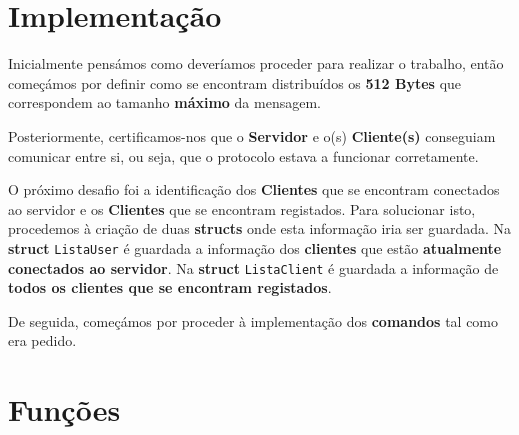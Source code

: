 \documentclass[11pt]{article}   %
\begin{document}
\section{Implementação}

\hspace{0,5cm}Inicialmente pensámos como deveríamos proceder para realizar o trabalho, então 
começámos por definir como se encontram distribuídos os \textbf{512 Bytes} que correspondem ao
tamanho \textbf{máximo} da mensagem.

Posteriormente, certificamos-nos que o \textbf{Servidor} e o(s) \textbf{Cliente(s)} conseguiam
comunicar entre si, ou seja, que o protocolo estava a funcionar corretamente.

O próximo desafio foi a identificação dos \textbf{Clientes} que se encontram conectados ao servidor
e os \textbf{Clientes} que se encontram registados. Para solucionar isto, procedemos à criação de duas
\textbf{structs} onde esta informação iria ser guardada. Na \textbf{struct} \verb|ListaUser| é guardada
a informação dos \textbf{clientes} que estão \textbf{atualmente conectados ao servidor}.
Na \textbf{struct} \verb|ListaClient| é guardada a informação de \textbf{todos os clientes que se encontram
registados}.

De seguida, começámos por proceder à implementação dos \textbf{comandos} tal como era pedido.

\section{Funções}
\end{document}
